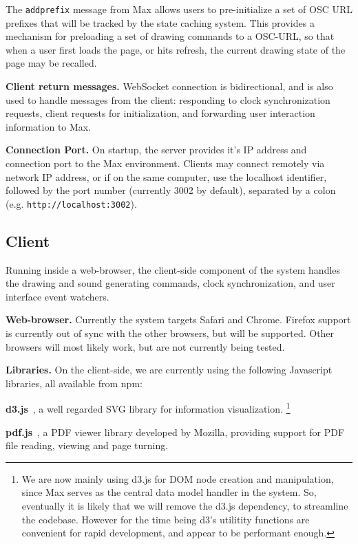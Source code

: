 The \texttt{addprefix} message from Max allows users to pre-initialize a set of OSC URL prefixes that will be tracked by the state caching system.
This provides a mechanism for preloading a set of drawing commands to a OSC-URL, so that when a user first loads the page, or hits refresh, the current drawing state of the page may be recalled.

\medskip
\noindent
\textbf{Client return messages.}
WebSocket connection is bidirectional, and is also used to handle messages from the client: responding to clock synchronization requests, client requests for initialization, and forwarding user interaction information to Max.

\medskip
\noindent
\textbf{Connection Port.} 
On startup, the server provides it's IP address and connection port to the Max environment.
Clients may connect remotely via network IP address, or if on the same computer, use the localhost identifier, followed by the port number (currently 3002 by default), separated by a colon (e.g. \texttt{http://localhost:3002}).
 
 \subsection{Client}  
Running inside a web-browser, the client-side component of the \drawsocket system handles the drawing and sound generating commands, clock synchronization, and user interface event watchers.

\medskip
\noindent
\textbf{Web-browser.}  
Currently the system targets Safari and Chrome. Firefox support is currently out of sync with the other browsers, but will be supported. Other browsers will most likely work, but are not currently being tested.

\medskip
\noindent
\textbf{Libraries.}
On the client-side, we are currently using the following Javascript libraries, all available from npm:

\textbf{d3.js}~\cite{d3}, a well regarded SVG library for information visualization. \footnote{We are now mainly using d3.js for DOM node creation and manipulation, since Max serves as the central data model handler in the \drawsocket system. So, eventually it is likely that we will remove the d3.js dependency, to streamline the codebase. However for the time being d3's utilitity functions are convenient for rapid development, and appear to be performant enough.}

\textbf{pdf.js}~\cite{pdfjs}, a PDF viewer library developed by Mozilla, providing support for PDF file reading, viewing and page turning.

